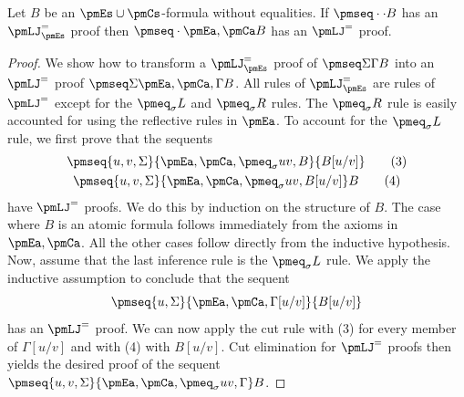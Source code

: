  Let $B$ be an $\pmEs\cup\pmCs$-formula without equalities. If $\pmseq\cdot\cdot B$ has an $\pmLJ^=_{\pmEs}$ proof then $\pmseq\cdot{\pmEa,\pmCa}B$ has an $\pmLJ^=$ proof.
\begin{proof}
We show how to transform a $\pmLJ^=_{\pmEs}$ proof of $\pmseq\Sigma\Gamma B$ into an $\pmLJ^=$ proof $\pmseq\Sigma{\pmEa,\pmCa,\Gamma}B$. All rules of $\pmLJ^=_{\pmEs}$ are rules of $\pmLJ^=$ except for the $\pmeq_\sigma L$ and $\pmeq_\sigma R$ rules. The $\pmeq_\sigma R$ rule is easily accounted for using the reflective rules in $\pmEa$. To account for the $\pmeq_\sigma L$ rule, we first prove that the sequents
\begin{gather*}\pmseq{u,v,\Sigma}{\pmEa,\pmCa,\pmeq_\sigma u v,B}{B[u/v]}\tag{3}\\
\pmseq{u,v,\Sigma}{\pmEa,\pmCa,\pmeq_\sigma u v,B[u/v]}B\tag{4}
\end{gather*}
have $\pmLJ^=$ proofs. We do this by induction on the structure of $B$. The case where $B$ is an atomic formula follows immediately from the axioms in $\pmEa,\pmCa$. All the other cases follow directly from the inductive hypothesis.
Now, assume that the last inference rule is the $\pmeq_\sigma L$ rule. We apply the inductive assumption to conclude that the sequent
\[\pmseq{u,\Sigma}{\pmEa,\pmCa,\Gamma[u/v]}{B[u/v]}\]
has an $\pmLJ^=$ proof. We can now apply the cut rule with (3) for every member of $\Gamma[u/v]$ and with (4) with $B[u/v]$. Cut elimination for $\pmLJ^=$ proofs then yields the desired proof of the sequent $\pmseq{u,v,\Sigma}{\pmEa,\pmCa,\pmeq_\sigma u v,\Gamma}B$.
\end{proof}
